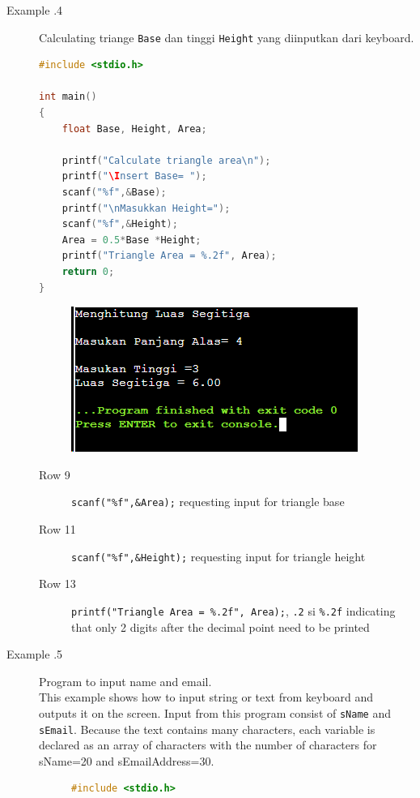 \begin{description}
	\item  [Example \thesubsection.4] Calculating triange \verb*|Base|   dan tinggi \verb*|Height| yang diinputkan dari keyboard. 
	\begin{lstlisting}[language=c]
#include <stdio.h>

int main()
{
	float Base, Height, Area;
	
	printf("Calculate triangle area\n");
	printf("\Insert Base= ");
	scanf("%f",&Base);
	printf("\nMasukkan Height=");
	scanf("%f",&Height);
	Area = 0.5*Base *Height;
	printf("Triangle Area = %.2f", Area);
	return 0;
}
	\end{lstlisting}
\begin{figure}[H]
	\centering
	\includegraphics[width=0.5\linewidth]{../P1/img/screenshot0005.png}
	\caption{}
	\label{fig:screenshot0005}
\end{figure}

\begin{description}
	\item [Row 9]\verb|scanf("%f",&Area);| requesting input for triangle base
	\item [Row 11]\verb|scanf("%f",&Height);| requesting input for triangle height
	\item [Row 13]\verb|printf("Triangle Area = %.2f", Area);|,  \verb|.2| si \verb|%.2f| indicating that only 2 digits after the decimal point need to be printed
\end{description}

	\item[Example \thesubsection.5] Program to input name and email.\\
	This example shows how to input string or text from keyboard and outputs it on the screen. Input from this program consist of \verb|sName| and \verb|sEmail|. Because the text contains many characters, each variable is declared as an array of characters with the number of characters for sName=20 and sEmailAddress=30.
	\begin{figure}[H]
	\begin{lstlisting}[language=c]
		#include <stdio.h>
		

\end{lstlisting}
\end{figure}
\end{description}
